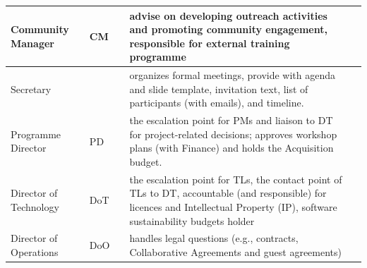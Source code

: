 \begin{tabularx}{\linewidth}{p{}|p{}|p{}|p{}|p{}}
Community Manager                                  & CM                    &                                                                                                                   & advise on developing outreach activities and promoting community engagement, responsible for external training programme                                                                                                               &                                                                                                                                      \\\hline
Secretary                                          &                       &                                                                                                                   & organizes formal meetings, provide with agenda and slide template, invitation text, list of participants (with emails), and timeline.                                                                                                  &                                                            \\\hline
Programme Director                                 & PD                    &                                                                                                                   & the escalation point for PMs and liaison to DT for project-related decisions; approves workshop plans (with Finance) and holds the Acquisition budget. &                                                                                                                                      \\\hline
Director of Technology                             & DoT                   &                                                                                                                   & the escalation point for TLs, the contact point of TLs to DT, accountable (and responsible) for licences and Intellectual Property (IP), software sustainability budgets holder                                                        &                                                                                                                                      \\\hline
Director of Operations                             & DoO                   &                                                                                                                   & handles legal questions (e.g., contracts, Collaborative Agreements and guest agreements)                                                                                               &                                                                                                                                      \\\hline

\end{tabularx}
